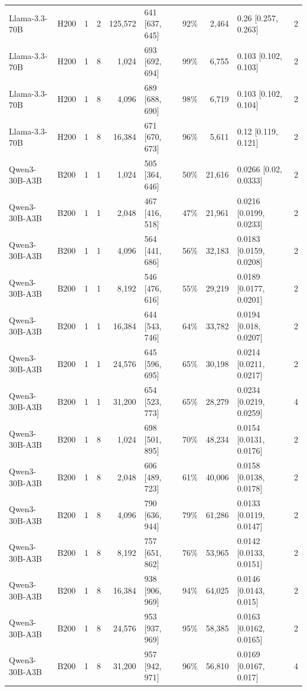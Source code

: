 \begin{landscape}
\begin{longtable}{llrrrlrrlr}
Llama-3.3-70B & H200 & 1 & 2 & 125,572 & 641 {[}637, 645{]} & 92\% & 2,464 & 0.26 {[}0.257, 0.263{]} & 2 \\
Llama-3.3-70B & H200 & 1 & 8 & 1,024 & 693 {[}692, 694{]} & 99\% & 6,755 & 0.103 {[}0.102, 0.103{]} & 2 \\
Llama-3.3-70B & H200 & 1 & 8 & 4,096 & 689 {[}688, 690{]} & 98\% & 6,719 & 0.103 {[}0.102, 0.104{]} & 2 \\
Llama-3.3-70B & H200 & 1 & 8 & 16,384 & 671 {[}670, 673{]} & 96\% & 5,611 & 0.12 {[}0.119, 0.121{]} & 2 \\
Qwen3-30B-A3B & B200 & 1 & 1 & 1,024 & 505 {[}364, 646{]} & 50\% & 21,616 & 0.0266 {[}0.02, 0.0333{]} & 2 \\
Qwen3-30B-A3B & B200 & 1 & 1 & 2,048 & 467 {[}416, 518{]} & 47\% & 21,961 & 0.0216 {[}0.0199, 0.0233{]} & 2 \\
Qwen3-30B-A3B & B200 & 1 & 1 & 4,096 & 564 {[}441, 686{]} & 56\% & 32,183 & 0.0183 {[}0.0159, 0.0208{]} & 2 \\
Qwen3-30B-A3B & B200 & 1 & 1 & 8,192 & 546 {[}476, 616{]} & 55\% & 29,219 & 0.0189 {[}0.0177, 0.0201{]} & 2 \\
Qwen3-30B-A3B & B200 & 1 & 1 & 16,384 & 644 {[}543, 746{]} & 64\% & 33,782 & 0.0194 {[}0.018, 0.0207{]} & 2 \\
Qwen3-30B-A3B & B200 & 1 & 1 & 24,576 & 645 {[}596, 695{]} & 65\% & 30,198 & 0.0214 {[}0.0211, 0.0217{]} & 2 \\
Qwen3-30B-A3B & B200 & 1 & 1 & 31,200 & 654 {[}523, 773{]} & 65\% & 28,279 & 0.0234 {[}0.0219, 0.0259{]} & 4 \\
Qwen3-30B-A3B & B200 & 1 & 8 & 1,024 & 698 {[}501, 895{]} & 70\% & 48,234 & 0.0154 {[}0.0131, 0.0176{]} & 2 \\
Qwen3-30B-A3B & B200 & 1 & 8 & 2,048 & 606 {[}489, 723{]} & 61\% & 40,006 & 0.0158 {[}0.0138, 0.0178{]} & 2 \\
Qwen3-30B-A3B & B200 & 1 & 8 & 4,096 & 790 {[}636, 944{]} & 79\% & 61,286 & 0.0133 {[}0.0119, 0.0147{]} & 2 \\
Qwen3-30B-A3B & B200 & 1 & 8 & 8,192 & 757 {[}651, 862{]} & 76\% & 53,965 & 0.0142 {[}0.0133, 0.0151{]} & 2 \\
Qwen3-30B-A3B & B200 & 1 & 8 & 16,384 & 938 {[}906, 969{]} & 94\% & 64,025 & 0.0146 {[}0.0143, 0.015{]} & 2 \\
Qwen3-30B-A3B & B200 & 1 & 8 & 24,576 & 953 {[}937, 969{]} & 95\% & 58,385 & 0.0163 {[}0.0162, 0.0165{]} & 2 \\
Qwen3-30B-A3B & B200 & 1 & 8 & 31,200 & 957 {[}942, 971{]} & 96\% & 56,810 & 0.0169 {[}0.0167, 0.017{]} & 4 \\

\end{longtable}
\end{landscape}
